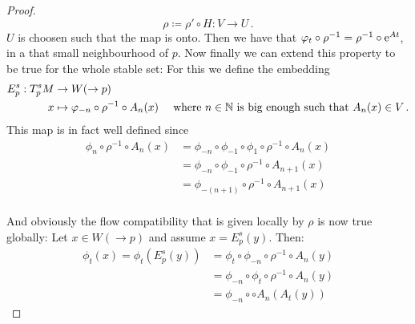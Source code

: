 \begin{proof}
	\begin{equation*}
		\rho\coloneq \rho'\circ H: V \to U\, .
	\end{equation*} $U$ is choosen such that the map is onto. Then we have that $\varphi_t\circ \rho^{-1}=\rho^{-1} \circ \mathrm{e}^{At}$, in a that small neighbourhood of $p$. Now finally we can extend this property to be true for the whole stable set:
	For this we define the embedding
	\begin{align*}
		E^s_p: T^s_pM &\to W(\to p)\\
		x&\mapsto \varphi_{-n} \circ\rho^{-1} \circ A_n(x) \quad \text{ where }n\in \mathbb{N} \text{ is big enough such that }A_n(x)\in V\,.
	\end{align*} This map is in fact well defined since
	\begin{align*}
		\phi_n \circ\rho^{-1} \circ A_n(x)
		&=\phi_{-n} \circ \phi_{-1}\circ \phi_1 \circ \rho^{-1} \circ A_n(x)\\
		&=\phi_{-n} \circ \phi_{-1}\circ \rho^{-1} \circ A_{n+1}(x)\\
		&=\phi_{-(n+1)} \circ \rho^{-1} \circ A_{n+1}(x)\\
	\end{align*}
	
	And obviously the flow compatibility that is given locally by $\rho$ is now true globally: Let $x\in W(\to p)$ and assume $x=E^s_p(y)$. Then:
	\begin{align*}
		\phi_t(x)=\phi_t(E^s_p(y))
		&=\phi_t\circ \phi_{-n}\circ \rho^{-1}\circ A_n(y)\\
		&=\phi_{-n}\circ \phi_t\circ \rho^{-1}\circ A_n(y) \\
		&=\phi_{-n}\circ \circ A_n(A_t(y))
	\end{align*}
\end{proof}















